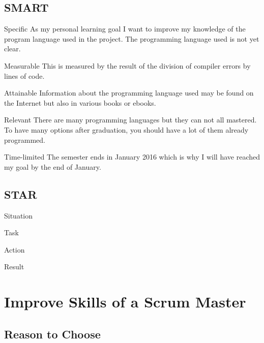 \documentclass[12pt]{article}
\begin{document}
	    \subsection{SMART}
			\begin{SMART}
			    \item[Specific] As my personal learning goal I want to improve my knowledge of the program language used in the project. The programming language used is not yet clear.
			    \item[Measurable] This is measured by the result of the division of compiler errors by lines of code.
				\item[Attainable] Information about the programming language used may be found on the Internet but also in various books or ebooks.
				\item[Relevant] There are many programming languages but they can not all mastered. To have many options after graduation, you should have a lot of them already programmed.
			    \item[Time-limited] The semester ends in January 2016 which is why I will have reached my goal by the end of January.
			\end{SMART}

		\subsection{STAR}
			\begin{STAR}
			    \item[Situation] 
			    \item[Task] 
			    \item[Action] 
			    \item[Result] 
			\end{STAR}
	\pagebreak

	\section{Improve Skills of a Scrum Master}
		\subsection{Reason to Choose}
			
	
\end{document}
